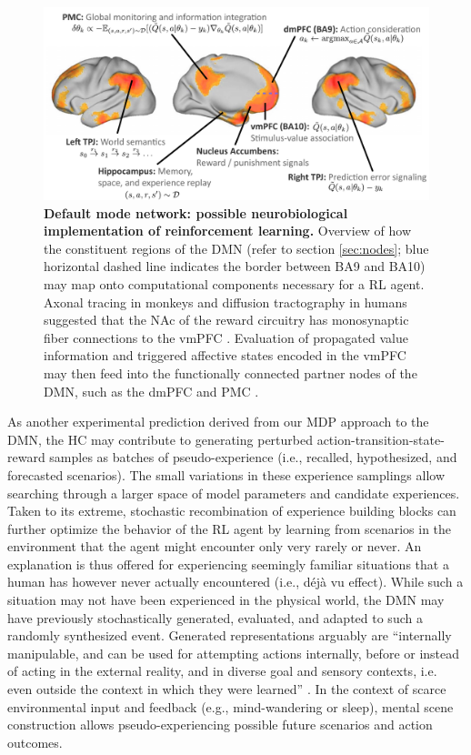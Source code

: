 \documentclass[10pt,letterpaper]{article}
\begin{document}
  
\begin{figure}[!h]
  \includegraphics[width=.9\linewidth]{neurobiological_and_rl_overview_DMN.pdf}
  \caption{\textbf{Default mode network:
  possible neurobiological implementation of reinforcement learning.}
  Overview of how the constituent regions of the DMN (refer to section \ref{sec:nodes}; blue horizontal dashed line indicates the border between BA9 and BA10) may
  map onto computational components necessary for a RL agent.
  Axonal tracing in monkeys and diffusion tractography in humans suggested
  that the NAc of the reward circuitry has monosynaptic fiber connections
  to the vmPFC \citep{haber1995, croxson2005quantitative}. Evaluation of
  propagated value information and triggered affective states encoded
  in the vmPFC may then feed into the functionally connected partner nodes of
  the DMN, such as the dmPFC and PMC \citep{andrews2010, bzdok2013segregation}.
}
  \label{fig:rl_process_chart}
\end{figure}







As another experimental prediction derived from our MDP approach to the DMN,
the HC may contribute to generating
perturbed action-transition-state-reward samples
as batches of pseudo-experience
(i.e., recalled, hypothesized, and forecasted scenarios).
The small variations in these experience samplings allow searching through
a larger space of model parameters and candidate experiences.
Taken to its extreme, stochastic recombination of experience
building blocks can further optimize the behavior of the RL agent
by learning from scenarios in the environment that the agent might
encounter only very rarely or never.
An explanation is thus offered for experiencing seemingly familiar situations that
a human has however never actually encountered (i.e., d\'{e}j\`{a} vu effect).
While such a situation may not have been experienced in the physical world,
the DMN may have previously stochastically generated, evaluated, and adapted to
such a randomly synthesized event.
Generated representations arguably are ``internally manipulable,
and can be used for attempting actions internally,
before or instead of acting in the external reality,
and in diverse goal and sensory contexts, i.e. even outside the context in which they were learned''
\citep{pezzulo2011grounding}.
In the context of scarce environmental input and feedback
(e.g., mind-wandering or sleep),
mental scene construction allows pseudo-experiencing possible
future scenarios and action outcomes.
\end{document}
